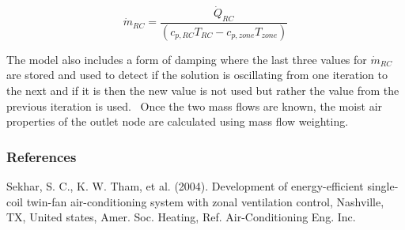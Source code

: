 \begin{equation}
{\dot m_{RC}} = \frac{{{{\dot Q}_{RC}}}}{{\left( {{c_{p,RC}}{T_{RC}} - {c_{p,zone}}{T_{zone}}} \right)}}
\end{equation}

The model also includes a form of damping where the last three values for \({\dot m_{RC}}\) are stored and used to detect if the solution is oscillating from one iteration to the next and if it is then the new value is not used but rather the value from the previous iteration is used.~ Once the two mass flows are known, the moist air properties of the outlet node are calculated using mass flow weighting.

\subsubsection{References}\label{references-6}

Sekhar, S. C., K. W. Tham, et al. (2004). Development of energy-efficient single-coil twin-fan air-conditioning system with zonal ventilation control, Nashville, TX, United states, Amer. Soc. Heating, Ref. Air-Conditioning Eng. Inc.
